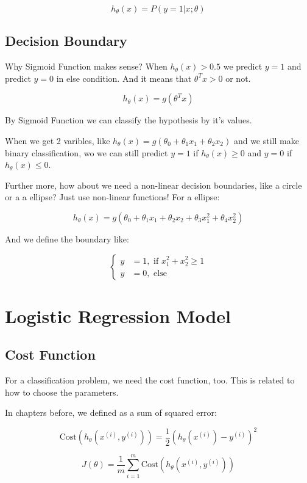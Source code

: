 \documentclass[black,simple]{../elegantbook}
\begin{document}
\[
h_\theta (x) = P(y = 1 | x;\theta)    
\]

\subsection{Decision Boundary}

Why Sigmoid Function makes sense? When \(h_\theta (x) > 0.5\) we predict \(y = 1\) and predict \(y = 0\) in else condition. And it means that \(\theta^T x > 0\) or not. 

\[
h_\theta (x) = g(\theta^T x)    
\]

By Sigmoid Function we can classify the hypothesis by it's values.

When we get 2 varibles, like \(h_\theta(x) = g(\theta_0 + \theta_1 x_1 + \theta_2 x_2)\) and we still make binary classification, wo we can still predict \(y = 1\) if \(h_\theta(x) \ge 0\) and \(y = 0\) if \(h_\theta(x) \le 0\).

Further more, how about we need a non-linear decision boundaries, like a circle or a a ellipse? Just use non-linear functions! For a ellipse:

\[
h_\theta(x) = g(\theta_0 + \theta_1 x_1 + \theta_2 x_2 + \theta_3 x_1^2 + \theta_4 x_2^2)     
\]

And we define the boundary like: 

\[
\left\{
\begin{aligned}
    y &= 1, \text{ if } x_1^2 + x_2^2 \ge 1\\
    y &= 0, \text{ else}
\end{aligned}    
\right.
\]

\section{Logistic Regression Model}

\subsection{Cost Function}

For a classification problem, we need the cost function, too. This is related to how to choose the parameters.

In chapters before, we defined as a sum of squared error:
 
\[
\text{Cost} \left(h_\theta(x^{(i)}, y^{(i)})\right) = \frac{1}{2} \left(h_\theta(x^{(i)} )- y^{(i)}\right) ^2
\]

\[
J(\theta) = \frac{1}{m} \sum_{i = 1}^m \text{Cost} (h_\theta(x^{(i)}, y^{(i)}))
\]
\end{document}
